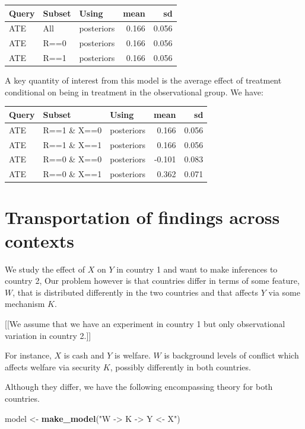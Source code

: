 \documentclass[12pt,]{book}
\newenvironment{Shaded}{\begin{snugshade}}{\end{snugshade}}
\newcommand{\KeywordTok}[1]{\textcolor[rgb]{0.13,0.29,0.53}{\textbf{#1}}}
\newcommand{\NormalTok}[1]{#1}
\newcommand{\StringTok}[1]{\textcolor[rgb]{0.31,0.60,0.02}{#1}}
\begin{document}
\begin{tabular}{l|l|l|r|r}
\hline
Query & Subset & Using & mean & sd\\
\hline
ATE & All & posteriors & 0.166 & 0.056\\
\hline
ATE & R==0 & posteriors & 0.166 & 0.056\\
\hline
ATE & R==1 & posteriors & 0.166 & 0.056\\
\hline
\end{tabular}

A key quantity of interest from this model is the average effect of treatment conditional on being in treatment in the observational group. We have:

\begin{tabular}{l|l|l|r|r}
\hline
Query & Subset & Using & mean & sd\\
\hline
ATE & R==1 \& X==0 & posteriors & 0.166 & 0.056\\
\hline
ATE & R==1 \& X==1 & posteriors & 0.166 & 0.056\\
\hline
ATE & R==0 \& X==0 & posteriors & -0.101 & 0.083\\
\hline
ATE & R==0 \& X==1 & posteriors & 0.362 & 0.071\\
\hline
\end{tabular}

\hypertarget{transportation-of-findings-across-contexts}{%
\section{Transportation of findings across contexts}\label{transportation-of-findings-across-contexts}}

We study the effect of \(X\) on \(Y\) in country 1 and want to make inferences to country 2, Our problem however is that countries differ in terms of some feature, \(W\), that is distributed differently in the two countries and that affects \(Y\) via some mechanism \(K\).

{[}{[}We assume that we have an experiment in country 1 but only observational variation in country 2.{]}{]}

For instance, \(X\) is cash and \(Y\) is welfare. \(W\) is background levels of conflict which affects welfare via security \(K\), possibly differently in both countries.

Although they differ, we have the following encompassing theory for both countries.

\begin{Shaded}
\begin{Highlighting}[]
\NormalTok{model <-}\StringTok{ }\KeywordTok{make_model}\NormalTok{(}\StringTok{"W -> K -> Y <- X"}\NormalTok{)}
\end{Highlighting}
\end{Shaded}
\end{document}
